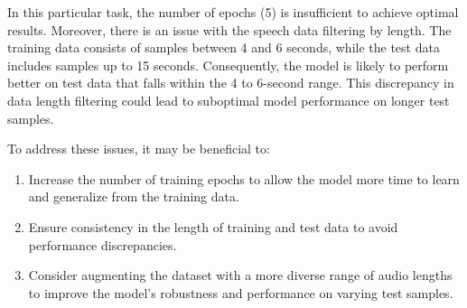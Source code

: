 \documentclass{article}
\begin{document}
In this particular task, the number of epochs (5) is insufficient to achieve optimal results. Moreover, there is an issue with the speech data filtering by length. The training data consists of samples between 4 and 6 seconds, while the test data includes samples up to 15 seconds. Consequently, the model is likely to perform better on test data that falls within the 4 to 6-second range. This discrepancy in data length filtering could lead to suboptimal model performance on longer test samples.

To address these issues, it may be beneficial to:

\begin{enumerate}
    \item Increase the number of training epochs to allow the model more time to learn and generalize from the training data.
    \item Ensure consistency in the length of training and test data to avoid performance discrepancies.
    \item Consider augmenting the dataset with a more diverse range of audio lengths to improve the model's robustness and performance on varying test samples.
\end{enumerate}
\end{document}
